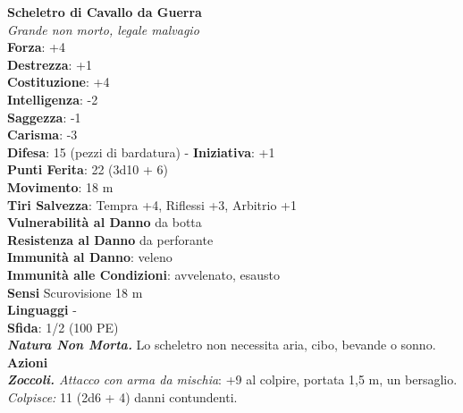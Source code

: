 \begin{multicols}{2}
\medskip\textbf{Scheletro di Cavallo da Guerra}\\
\emph{Grande non morto, legale malvagio}\\
\textbf{Forza}: +4\\
\textbf{Destrezza}: +1\\
\textbf{Costituzione}: +4\\
\textbf{Intelligenza}: -2\\
\textbf{Saggezza}: -1\\
\textbf{Carisma}: -3\\
\textbf{Difesa}: 15 (pezzi di bardatura) - \textbf{Iniziativa}: +1\\
\textbf{Punti Ferita}: 22 (3d10 + 6)\\
\textbf{Movimento}: 18 m\\
\textbf{Tiri Salvezza}: Tempra +4, Riflessi +3, Arbitrio +1\\
\textbf{Vulnerabilità al Danno} da botta\\
\textbf{Resistenza al Danno} da perforante\\
\textbf{Immunità al Danno}: veleno\\
\textbf{Immunità alle Condizioni}: avvelenato, esausto\\
\textbf{Sensi} Scurovisione 18 m\\
\textbf{Linguaggi} -\\
\textbf{Sfida}: 1/2 (100 PE)\smallskip\\
\emph{\textbf{Natura Non Morta.}} Lo scheletro non necessita aria, cibo, bevande o sonno.\\
\smallskip\textbf{Azioni}\\
\emph{\textbf{Zoccoli.} Attacco con arma da mischia}: +9 al colpire, portata 1,5 m, un bersaglio.\\
\emph{Colpisce:} 11 (2d6 + 4) danni contundenti.\\


\end{multicols}

